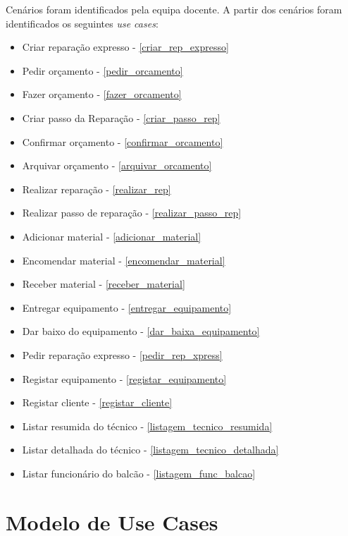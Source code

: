 \documentclass[a4paper,12pt]{scrreprt}
\begin{document}
Cenários foram identificados pela equipa docente.
A partir dos cenários foram identificados os seguintes \textit{use cases}:
\begin{itemize}
        \item Criar reparação expresso - \ref{criar_rep_expresso}
        \item Pedir orçamento - \ref{pedir_orcamento}
        \item Fazer orçamento - \ref{fazer_orcamento}
        \item Criar passo da Reparação - \ref{criar_passo_rep}
        \item Confirmar orçamento - \ref{confirmar_orcamento}
        \item Arquivar orçamento - \ref{arquivar_orcamento}
        \item Realizar reparação - \ref{realizar_rep}
        \item Realizar passo de reparação - \ref{realizar_passo_rep}
        \item Adicionar material - \ref{adicionar_material}
        \item Encomendar material - \ref{encomendar_material}
        \item Receber material - \ref{receber_material}
        \item Entregar equipamento - \ref{entregar_equipamento}
        \item Dar baixo do equipamento - \ref{dar_baixa_equipamento}
        \item Pedir reparação expresso - \ref{pedir_rep_xpress}
        \item Registar equipamento - \ref{registar_equipamento}
        \item Registar cliente - \ref{registar_cliente}
        \item Listar resumida do técnico - \ref{listagem_tecnico_resumida}
        \item Listar detalhada do técnico - \ref{listagem_tecnico_detalhada}
        \item Listar funcionário do balcão - \ref{listagem_func_balcao}
\end{itemize}
\section{Modelo de Use Cases}
\end{document}
